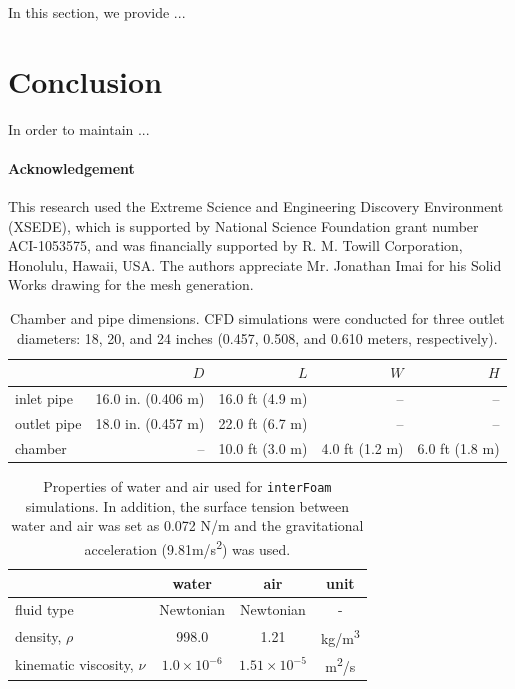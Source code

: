 In this section, we provide ...

\section{Conclusion}

In order to maintain ...

\paragraph{Acknowledgement}

This research used the Extreme Science and Engineering Discovery Environment
(XSEDE), which is supported by National Science Foundation grant number
ACI-1053575, and was financially supported by R. M. Towill Corporation,
Honolulu, Hawaii, USA. The authors appreciate Mr. Jonathan Imai for
his Solid Works drawing for the mesh generation.

\newpage\null
\vfill
\begin{table}[H]
\begin{centering}
\begin{tabular}{|l|r|r|r|r|}
\hline 
 & $D$ & $L$ & $W$ & $H$\tabularnewline
\hline 
\hline 
inlet pipe & 16.0 in. (0.406 m) & 16.0 ft (4.9 m) & -- & --\tabularnewline
\hline 
outlet pipe & 18.0 in. (0.457 m) & 22.0 ft (6.7 m) & -- & --\tabularnewline
\hline 
chamber & -- & 10.0 ft (3.0 m) & 4.0 ft (1.2 m) & 6.0 ft (1.8 m)\tabularnewline
\hline 
\end{tabular}
\par\end{centering}
\caption{Chamber and pipe dimensions. CFD simulations were conducted for three
outlet diameters: 18, 20, and 24 inches (0.457, 0.508, and 0.610 meters,
respectively).}

\label{tab:dimensions}
\end{table}

\vfill\newpage\null
\vfill
\begin{table}[H]
\begin{centering}
\begin{tabular}{|l|c|c|c|}
\hline 
 & water & air & unit\tabularnewline
\hline 
\hline 
fluid type & Newtonian & Newtonian & -\tabularnewline
\hline 
density, $\rho$ & 998.0 & 1.21 & kg/m\textsuperscript{3}\tabularnewline
\hline 
kinematic viscosity, $\nu$ & $1.0\times10^{-6}$ & $1.51\times10^{-5}$ & m\textsuperscript{2}/s\tabularnewline
\hline 
\end{tabular}
\par\end{centering}
\caption{Properties of water and air used for \texttt{interFoam} simulations.
In addition, the surface tension between water and air was set as
0.072 N/m and the gravitational acceleration (9.81m/s\protect\protect\textsuperscript{2})
was used.}

\label{tab:matt-prop}
\end{table}

